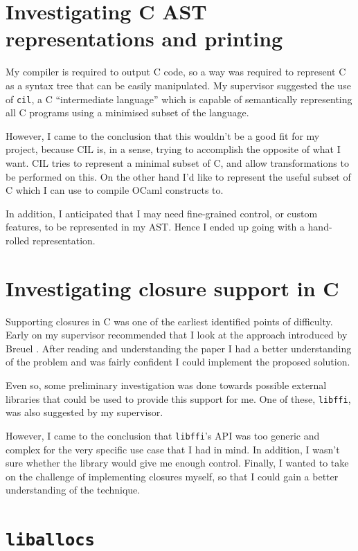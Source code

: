 \documentclass[12pt,a4paper,twoside,openright]{report}
\begin{document}
\section{Investigating C AST representations and printing}

My compiler is required to output C code, so a way was required to represent C
as a syntax tree that can be easily manipulated. My supervisor suggested the
use of \lstinline!cil!, a C ``intermediate language'' which is capable of
semantically representing all C programs using a minimised subset of the language.

However, I came to the conclusion that this wouldn't be a good fit for my project, because
 CIL is, in a sense, trying to accomplish the opposite of what I want. CIL
 tries to represent a minimal subset of C, and allow transformations to be
 performed on this. On the other hand I'd like to represent the useful subset
 of C which I can use to compile OCaml constructs to.

In addition, I anticipated that I may need fine-grained control, or custom
features, to be represented in my AST. Hence I ended up going with a hand-rolled
representation.


\section{Investigating closure support in C}

Supporting closures in C was one of the earliest identified points of difficulty.
Early on my supervisor recommended that I look at the approach introduced by
Breuel \cite{breuel88}. After reading and understanding the paper I had a
better understanding of the problem and was fairly confident I could implement
the proposed solution.

Even so, some preliminary investigation was done towards possible external
libraries that could be used to provide this support for me. One of these,
\lstinline!libffi!, was also suggested by my supervisor.

However, I came to the conclusion that \lstinline!libffi!'s API was too generic
and complex for the very specific use case that I had in mind. In addition, I
wasn't sure whether the library would give me enough control. Finally, I wanted
to take on the challenge of implementing closures myself, so that I could gain
a better understanding of the technique.

\section{\texttt{liballocs}}\label{liballocs}
\end{document}
